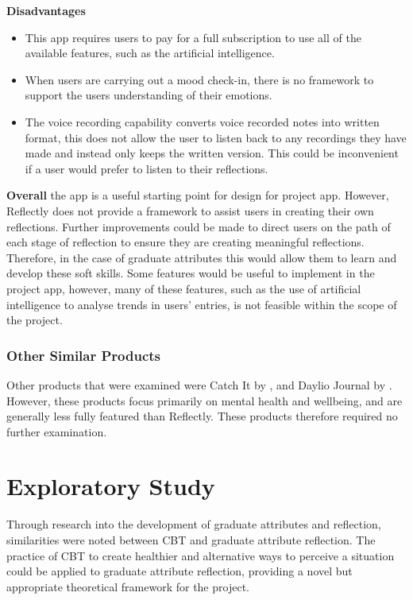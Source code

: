 \documentclass{l4proj}
\begin{document}
\textbf{Disadvantages}
\begin{itemize}
    \item This app requires users to pay for a full subscription to use all of the available features, such as the artificial intelligence. 
    \item When users are carrying out a mood check-in, there is no framework to support the users understanding of their emotions.
    \item The voice recording capability converts voice recorded notes into written format, this does not allow the user to listen back to any recordings they have made and instead only keeps the written version. This could be inconvenient if a user would prefer to listen to their reflections.
\end{itemize}

\textbf{Overall} the app is a useful starting point for design for project app. However, Reflectly does not provide a framework to assist users in creating their own reflections. Further improvements could be made to direct users on the path of each stage of reflection to ensure they are creating meaningful reflections. Therefore, in the case of graduate attributes this would allow them to learn and develop these soft skills. Some features would be useful to implement in the project app, however, many of these features, such as the use of artificial intelligence to analyse trends in users’ entries, is not feasible within the scope of the project.

\subsection{Other Similar Products}

Other products that were examined were Catch It by \citet{nhsDigital_catch_2021}, and Daylio Journal by \citet{relaxio_src_daylio_2021}. However, these products focus primarily on mental health and wellbeing, and are generally less fully featured than Reflectly. These products therefore required no further examination.

\chapter{Exploratory Study} \label{ExploratoryStudy}

Through research into the development of graduate attributes and reflection, similarities were noted between CBT and graduate attribute reflection. The practice of CBT to create healthier and alternative ways to perceive a situation could be applied to graduate attribute reflection, providing a novel but appropriate theoretical framework for the project.
\end{document}
